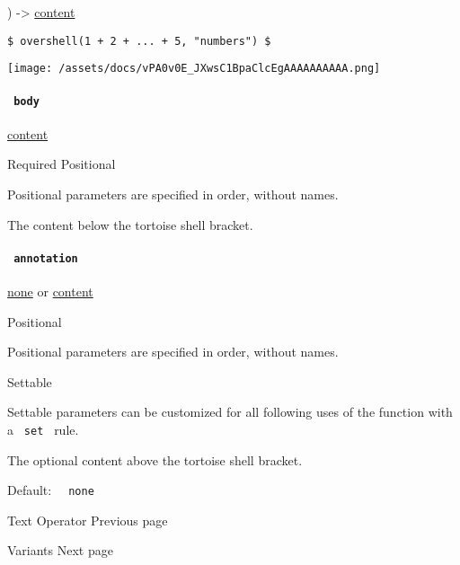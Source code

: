 ) -\textgreater{} \href{/docs/reference/foundations/content/}{content}

\begin{verbatim}
$ overshell(1 + 2 + ... + 5, "numbers") $
\end{verbatim}

\texttt{[image: /assets/docs/vPA0v0E\_JXwsC1BpaClcEgAAAAAAAAAA.png]}

\paragraph{\texorpdfstring{\texttt{\ body\ }}{ body }}\label{functions-overshell-body}

\href{/docs/reference/foundations/content/}{content}

{Required} {{ Positional }}

\label{functions-overshell-body-positional-tooltip}
Positional parameters are specified in order, without names.

The content below the tortoise shell bracket.

\paragraph{\texorpdfstring{\texttt{\ annotation\ }}{ annotation }}\label{functions-overshell-annotation}

\href{/docs/reference/foundations/none/}{none} {or}
\href{/docs/reference/foundations/content/}{content}

{{ Positional }}

\label{functions-overshell-annotation-positional-tooltip}
Positional parameters are specified in order, without names.

{{ Settable }}

\label{functions-overshell-annotation-settable-tooltip}
Settable parameters can be customized for all following uses of the
function with a \texttt{\ set\ } rule.

The optional content above the tortoise shell bracket.

Default: \texttt{\ }{\texttt{\ none\ }}\texttt{\ }

\href{/docs/reference/math/op/}{\pandocbounded{}}

{ Text Operator } { Previous page }

\href{/docs/reference/math/variants/}{\pandocbounded{}}

{ Variants } { Next page }
